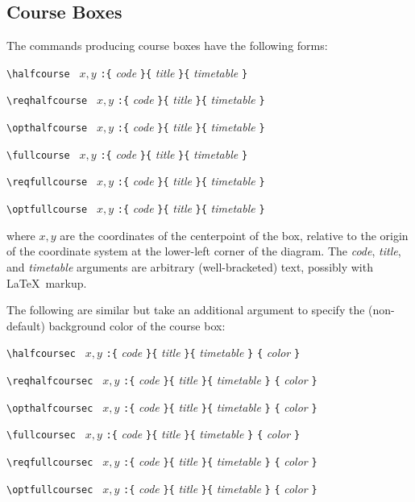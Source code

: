 \documentclass[11pt]{article}
\begin{document}
\subsection{Course Boxes}
The commands producing course boxes have the following forms:
\begin{list}{}{}
\item \verb|\halfcourse | $x,y$ \verb|:{| \emph{code} \verb|}{| \emph{title} \verb|}{| \emph{timetable} \verb|}|
\item \verb|\reqhalfcourse | $x,y$ \verb|:{| \emph{code} \verb|}{| \emph{title} \verb|}{| \emph{timetable} \verb|}|
\item \verb|\opthalfcourse | $x,y$ \verb|:{| \emph{code} \verb|}{| \emph{title} \verb|}{| \emph{timetable} \verb|}|
\item \verb|\fullcourse | $x,y$ \verb|:{| \emph{code} \verb|}{| \emph{title} \verb|}{| \emph{timetable} \verb|}|
\item \verb|\reqfullcourse | $x,y$ \verb|:{| \emph{code} \verb|}{| \emph{title} \verb|}{| \emph{timetable} \verb|}|
\item \verb|\optfullcourse | $x,y$ \verb|:{| \emph{code} \verb|}{| \emph{title} \verb|}{| \emph{timetable} \verb|}|
\end{list}
where
$x,y$
are the coordinates of the 
centerpoint 
of the box, relative to the origin
of the coordinate system at the lower-left corner of the diagram.
The 
\emph{code},
\emph{title},
and
\emph{timetable}
arguments are arbitrary (well-bracketed) text, possibly with \LaTeX\ markup.

The following are similar but take an additional argument to specify
the (non-default) background color of the course box:
\begin{list}{}{}
\item \verb|\halfcoursec | $x,y$ \verb|:{| \emph{code} \verb|}{| \emph{title} \verb|}{| \emph{timetable} \verb|}| \verb|{| \emph{color} \verb|}|
\item \verb|\reqhalfcoursec | $x,y$ \verb|:{| \emph{code} \verb|}{| \emph{title} \verb|}{| \emph{timetable} \verb|}| \verb|{| \emph{color} \verb|}|
\item \verb|\opthalfcoursec | $x,y$ \verb|:{| \emph{code} \verb|}{| \emph{title} \verb|}{| \emph{timetable} \verb|}| \verb|{| \emph{color} \verb|}|
\item \verb|\fullcoursec | $x,y$ \verb|:{| \emph{code} \verb|}{| \emph{title} \verb|}{| \emph{timetable} \verb|}| \verb|{| \emph{color} \verb|}|
\item \verb|\reqfullcoursec | $x,y$ \verb|:{| \emph{code} \verb|}{| \emph{title} \verb|}{| \emph{timetable} \verb|}| \verb|{| \emph{color} \verb|}|
\item \verb|\optfullcoursec | $x,y$ \verb|:{| \emph{code} \verb|}{| \emph{title} \verb|}{| \emph{timetable} \verb|}| \verb|{| \emph{color} \verb|}|
\end{list}
\end{document}
